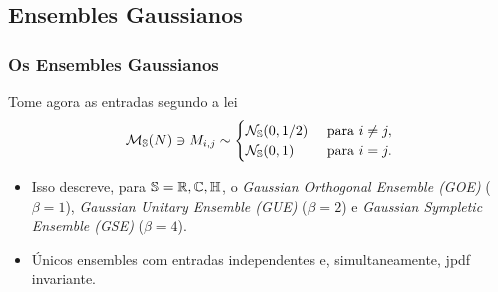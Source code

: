 \subsection{Ensembles Gaussianos}
\begin{frame}	
\frametitle{Os Ensembles Gaussianos}
	Tome agora as entradas segundo a lei 
	\[
	\mathcal{M}_{\mathbb{S}}(N) \ni M_{i,j} \sim
	\begin{cases}
		\mathcal{N}_{\mathbb{S}}(0,1/2) &  \ \text{para} \ i \neq j,\\
		\mathcal{N}_{\mathbb{S}}(0,1) & \ \text{para} \ i = j.
	\end{cases}
	\]
	\begin{itemize}
		\item Isso descreve, para $\mathbb{S} = \mathbb{R}, \mathbb{C}, \mathbb{H}$, o \textit{Gaussian Orthogonal Ensemble (GOE)} ($\beta=1$), \textit{Gaussian Unitary Ensemble (GUE)} ($\beta=2$) e \textit{Gaussian Sympletic Ensemble (GSE)} ($\beta=4$).
		
		\item Únicos ensembles com entradas independentes e, simultaneamente, jpdf invariante.
	\end{itemize}
\end{frame}
